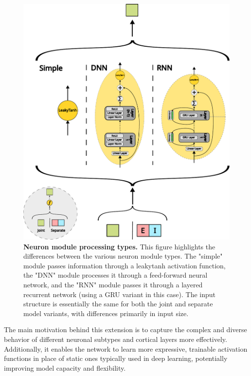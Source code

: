 \begin{figure}
    \centering
    \includegraphics[width=\linewidth]{img/neuron_module.pdf}
    \caption{\textbf{Neuron module processing types.} This figure highlights the differences between the various neuron module types. The "simple" module passes information through a leakytanh activation function, the "DNN" module processes it through a feed-forward neural network, and the "RNN" module passes it through a layered recurrent network (using a GRU variant in this case). The input structure is essentially the same for both the joint and separate model variants, with differences primarily in input size.}
    \label{fig:neuron_modules}
\end{figure}

The main motivation behind this extension is to capture the complex and diverse behavior of different neuronal subtypes and cortical layers more effectively. Additionally, it enables the network to learn more expressive, trainable activation functions in place of static ones typically used in deep learning, potentially improving model capacity and flexibility.


